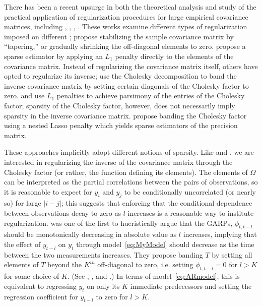 \documentclass[12pt]{article}
\theoremstyle{definition}
\begin{document}
There has been a recent upsurge in both the theoretical analysis and study of the practical application of regularization procedures for large empirical covariance matrices, including \citet{huang2006covariance}, \citet{furrer2007estimation}, \citet{fan2008high}, \citet{ledoit2004well}. These works examine different types of regularization imposed on different ; \citet{furrer2007estimation} propose stabilizing the sample covariance matrix by ``tapering,'' or gradually shrinking the off-diagonal elements to zero. \citet{d2008first} propose a sparse estimator by applying an $L_1$ penalty directly to the elements of the covariance matrix. Instead of regularizing the covariance matrix itself, others have opted to regularize its inverse;  \cite{wu2003nonparametric} use the Cholesky decomposition to band the inverse covariance matrix by setting certain diagonals of the Cholesky factor to zero. \citet{huang2006covariance} and \citet{levina2008sparse} use $L_1$ penalties to achieve parsimony of the entries of the Cholesky factor; sparsity of the Cholesky factor, however, does not necessarily imply sparsity in the inverse covariance matrix. \citet{levina2008sparse} propose banding the Cholesky factor using a nested Lasso penalty which yields sparse estimators of the precision matrix.  

These approaches implicitly adopt different notions of sparsity. Like \citet{huang2006covariance} and \citet{levina2008sparse}, we are interested in regularizing the inverse of the covariance matrix through the Cholesky factor (or rather, the function defining its elements). The elements of $\Omega$ can be interpreted as the partial correlations between the pairs of observations, so it is reasonable to expect for $y_i$ and $y_j$ to be conditionally uncorrelated (or nearly so) for large $\vert i-j \vert$; this suggests that enforcing that the conditional dependence between observations decay to zero as $l$ increases is a reasonable way to institute regularization. \cite{pourahmadi1999joint} was one of the first to hueristically argue that the GARPs, $\phi_{t,t-l}$ should be monotonically decreasing in absolute value as $l$ increases, implying that the effect of $y_{t-l}$ on $y_t$ through model~\ref{eq:MyModel} should decrease as the time between the two measurements increases. They propose banding $T$ by setting all elements of $T$ beyond the $K^{th}$ off-diagonal to zero, i.e. setting $\phi_{t,t-l}=0$ for $l > K$ for some choice of $K$.  (See \citet{wu2003nonparametric}, \cite{bickel2008regularized}, and \cite{huang2007estimation}.) In terms of model~\ref{eq:ARmodel}, this is equivalent to regressing $y_t$  on only its $K$ immediate predecessors and setting the regression coefficient for $y_{t-l}$ to zero for $l>K$.
\end{document}
